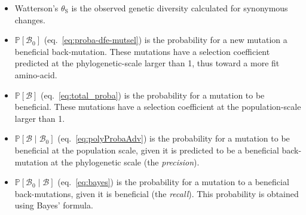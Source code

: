 \documentclass[12pt]{article}
\newcommand{\proba}{\mathbb{P}}
\newcommand{\SphyBen}{\mathcal{B}_0}
\newcommand{\given}{\mid}
\newcommand{\SpopBen}{\mathcal{B}}
\newcommand{\thetaSyn}{\theta_{\text{S}}}
\begin{document}
    \begin{itemize}
        \item Watterson's $\thetaSyn$ is the observed genetic diversity calculated for synonymous changes.
        \item $\proba [ \SphyBen ]$ (eq.~\ref{eq:proba-dfe-mutsel}) is the probability for a new mutation a beneficial back-mutation.
        These mutations have a selection coefficient predicted at the phylogenetic-scale larger than 1, thus toward a more fit amino-acid.
        \item $\proba [ \SpopBen ]$ (eq.~\ref{eq:total_proba}) is the probability for a mutation to be beneficial.
        These mutations have a selection coefficient at the population-scale larger than 1.
        \item $\proba [ \SpopBen \given \SphyBen]$ (eq.~\ref{eq:polyProbaAdv}) is the probability for a mutation to be beneficial at the population scale, given it is predicted to be a beneficial back-mutation at the phylogenetic scale (the \textit{precision}).
        \item $\proba [ \SphyBen \given \SpopBen]$ (eq.~\ref{eq:bayes}) is the probability for a mutation to a beneficial back-mutations, given it is beneficial (the \textit{recall}).
        This probability is obtained using Bayes' formula.
    \end{itemize}
    \newpage
\end{document}

